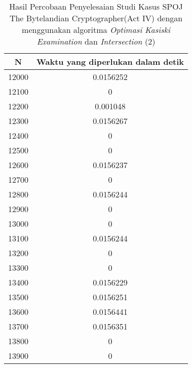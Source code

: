 \begin{table}[H]
\centering
\begin{tabular}{|c|c|}\hline
N&Waktu yang diperlukan dalam detik\\ \hline
12000&0.0156252\\ \hline
12100&0\\ \hline
12200&0.001048\\ \hline
12300&0.0156267\\ \hline
12400&0\\ \hline
12500&0\\ \hline
12600&0.0156237\\ \hline
12700&0\\ \hline
12800&0.0156244\\ \hline
12900&0\\ \hline
13000&0\\ \hline
13100&0.0156244\\ \hline
13200&0\\ \hline
13300&0\\ \hline
13400&0.0156229\\ \hline
13500&0.0156251\\ \hline
13600&0.0156441\\ \hline
13700&0.0156351\\ \hline
13800&0\\ \hline
13900&0\\ \hline
\end{tabular}
\caption {Hasil Percobaan Penyelesaian Studi Kasus SPOJ The Bytelandian Cryptographer(Act IV) dengan menggunakan algoritma \textit{Optimasi Kasiski Examination} dan \textit{Intersection} (2)}
\label{tab1:res4}
\end{table}
